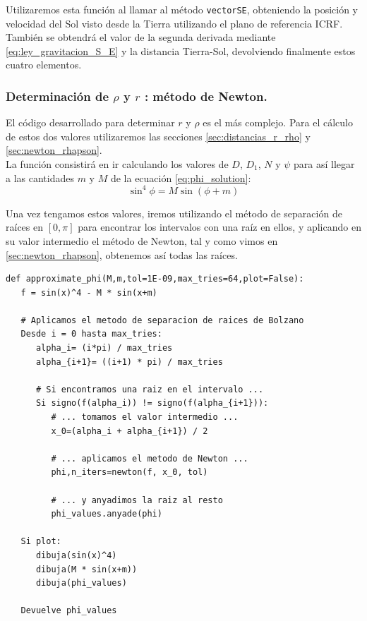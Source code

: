 \documentclass[11pt]{book}
\begin{document}
Utilizaremos esta función al llamar al método \texttt{vectorSE}, obteniendo la posición y velocidad del Sol visto desde la Tierra utilizando el plano de referencia ICRF. También se obtendrá el valor de la segunda derivada mediante \eqref{eq:ley_gravitacion_S_E} y la distancia Tierra-Sol, devolviendo finalmente estos cuatro elementos.\\

\subsubsection{Determinación de $\rho$ y $r$ : método de Newton.}
El código desarrollado para determinar $r$ y $\rho$ es el más complejo. Para el cálculo de estos dos valores utilizaremos las secciones \ref{sec:distancias_r_rho} y \ref{sec:newton_rhapson}.\\

La función consistirá en ir calculando los valores de $D$, $D_1$, $N$ y $\psi$ para así llegar a las cantidades $m$ y $M$ de la ecuación \eqref{eq:phi_solution}:
\[
\sin^4{\phi}=M\sin{(\phi+m)}
\]

Una vez tengamos estos valores, iremos utilizando el método de separación de raíces en $[0,\pi]$ para encontrar los intervalos con una raíz en ellos, y aplicando en su valor intermedio el método de Newton, tal y como vimos en \ref{sec:newton_rhapson}, obtenemos así todas las raíces.
\begin{lstlisting}[style=PythonCode]
def approximate_phi(M,m,tol=1E-09,max_tries=64,plot=False):	
   f = sin(x)^4 - M * sin(x+m)
   
   # Aplicamos el metodo de separacion de raices de Bolzano
   Desde i = 0 hasta max_tries:
      alpha_i= (i*pi) / max_tries
      alpha_{i+1}= ((i+1) * pi) / max_tries
      
      # Si encontramos una raiz en el intervalo ...
      Si signo(f(alpha_i)) != signo(f(alpha_{i+1})):
         # ... tomamos el valor intermedio ...
         x_0=(alpha_i + alpha_{i+1}) / 2
         
         # ... aplicamos el metodo de Newton ...
         phi,n_iters=newton(f, x_0, tol)
         
         # ... y anyadimos la raiz al resto
         phi_values.anyade(phi)
   
   Si plot:
      dibuja(sin(x)^4)
      dibuja(M * sin(x+m))
      dibuja(phi_values)
   
   Devuelve phi_values
\end{lstlisting}
\end{document}
